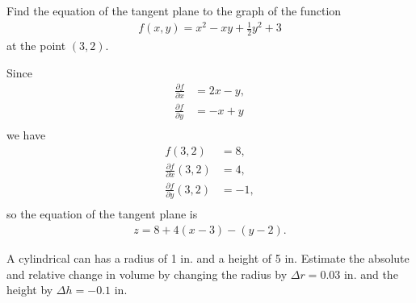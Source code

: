 \documentclass[12pt,letterpaper,reqno]{article}
\numberwithin{equation}{section}
\begin{document}
{\begin{exercise}
Find the equation of the tangent plane to the graph of the function
\begin{align*}
	f(x,y)=x^2-xy+\frac{1}{2}y^2+3
\end{align*}	
at the point $(3,2)$.
\end{exercise}

{\color{red}
\begin{solution}
Since
\begin{align*}
	\frac{\partial f}{\partial x}&=2x-y, \\
	\frac{\partial f}{\partial y}&=-x+y \\
\end{align*}
we have
\begin{align*}
	f(3,2)&=8, \\
	\frac{\partial f}{\partial x}(3,2)&=4, \\
	\frac{\partial f}{\partial y}(3,2)&=-1, \\
\end{align*}	
so the equation of the tangent plane is
\begin{align*}
	z=8+4(x-3)-(y-2).
\end{align*}
\end{solution}

}

\begin{exercise}
A cylindrical can has a radius of 1 in. and a height of 5 in. Estimate the absolute and relative change in volume by changing the radius by $\Delta r=0.03$ in. and the height by $\Delta h=-0.1$ in.	
\end{exercise}

}
\end{document}
